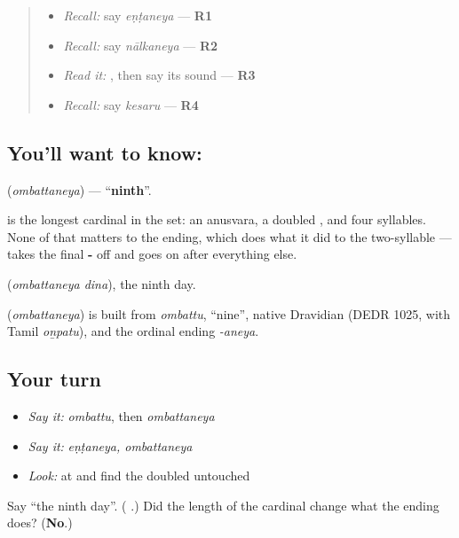 \begin{quote}
\begin{itemize}
\raggedright
  \item \emph{Recall:} say \emph{eṇṭaneya} — \textbf{R1}
  \item \emph{Recall:} say \emph{nālkaneya} — \textbf{R2}
  \item \emph{Read it:} \textbf{}, then say its sound — \textbf{R3}
  \item \emph{Recall:} say \emph{kesaru} — \textbf{R4}
\end{itemize}
\end{quote}

\subsection*{You'll want to know: }
\textbf{} (\emph{ombattaneya}) — \textquotedblleft{}\textbf{ninth}\textquotedblright{}.

\textbf{} is the longest cardinal in the set: an anusvara, a doubled \textbf{}, and four syllables. None of that matters to the ending, which does what it did to the two-syllable \textbf{} — takes the final \textbf{-} off and goes on after everything else.

\textbf{ } (\emph{ombattaneya dina}), the ninth day.

\begin{cousinweb}
\textbf{} (\emph{ombattaneya}) is built from \emph{ombattu}, \textquotedblleft{}nine\textquotedblright{}, native Dravidian (DEDR 1025, with Tamil \emph{oṉpatu}), and the ordinal ending \emph{-aneya}.
\end{cousinweb}

\subsection*{Your turn}
\begin{itemize}
\raggedright
  \item \emph{Say it:} \emph{ombattu}, then \emph{ombattaneya}
  \item \emph{Say it:} \emph{eṇṭaneya, ombattaneya}
  \item \emph{Look:} at  and find the doubled  untouched
\end{itemize}

\begin{tcolorbox}[breakable,colback=teal!4,colframe=teal!35!black,title={Before you move on}]
Say \textquotedblleft{}the ninth day\textquotedblright{}. (\textbf{ }.) Did the length of the cardinal change what the ending does? (\textbf{No}.)
\end{tcolorbox}
